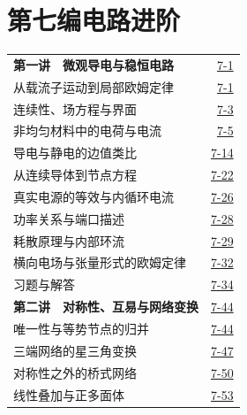 \section*{第七编\quad 电路进阶}
\begin{longtable}{@{}p{}r@{}}
\textbf{第一讲　微观导电与稳恒电路}&\href{course-page:7:4}{7-1}\\[2pt]
\hspace{1em}从载流子运动到局部欧姆定律&\href{course-page:7:4}{7-1}\\[2pt]
\hspace{1em}连续性、场方程与界面&\href{course-page:7:6}{7-3}\\[2pt]
\hspace{1em}非均匀材料中的电荷与电流&\href{course-page:7:8}{7-5}\\[2pt]
\hspace{1em}导电与静电的边值类比&\href{course-page:7:17}{7-14}\\[2pt]
\hspace{1em}从连续导体到节点方程&\href{course-page:7:25}{7-22}\\[2pt]
\hspace{1em}真实电源的等效与内循环电流&\href{course-page:7:29}{7-26}\\[2pt]
\hspace{1em}功率关系与端口描述&\href{course-page:7:31}{7-28}\\[2pt]
\hspace{1em}耗散原理与内部环流&\href{course-page:7:32}{7-29}\\[2pt]
\hspace{1em}横向电场与张量形式的欧姆定律&\href{course-page:7:35}{7-32}\\[2pt]
\hspace{1em}习题与解答&\href{course-page:7:37}{7-34}\\[2pt]
\textbf{第二讲　对称性、互易与网络变换}&\href{course-page:7:47}{7-44}\\[2pt]
\hspace{1em}唯一性与等势节点的归并&\href{course-page:7:47}{7-44}\\[2pt]
\hspace{1em}三端网络的星三角变换&\href{course-page:7:50}{7-47}\\[2pt]
\hspace{1em}对称性之外的桥式网络&\href{course-page:7:53}{7-50}\\[2pt]
\hspace{1em}线性叠加与正多面体&\href{course-page:7:56}{7-53}\\[2pt]

\end{longtable}
